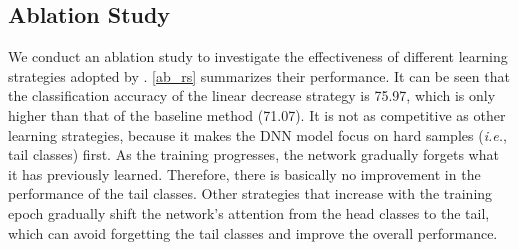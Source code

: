 \documentclass{article}
\def\ie{\emph{i.e.}} \def\Ie{\emph{I.e}\onedot}
\begin{document}
\subsection{Ablation Study}\label{sec:curr}

We conduct an ablation study to investigate the effectiveness of different learning strategies adopted by . \cref{ab_rs} summarizes their performance. It can be seen that the classification accuracy of the linear decrease strategy is 75.97, which is only higher than that of the baseline method (71.07). It is not as competitive as other learning strategies, because it makes the DNN model focus on hard samples (\ie, tail classes) first. As the training progresses, the network gradually forgets what it has previously learned. Therefore, there is basically no improvement in the performance of the tail classes. Other strategies that increase  with the training epoch  gradually shift the network's attention from the head classes to the tail, which can avoid forgetting the tail classes and improve the overall performance.
\end{document}
